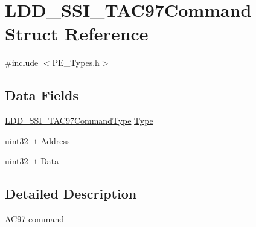 \hypertarget{struct_l_d_d___s_s_i___t_a_c97_command}{\section{L\-D\-D\-\_\-\-S\-S\-I\-\_\-\-T\-A\-C97\-Command Struct Reference}
\label{struct_l_d_d___s_s_i___t_a_c97_command}
}


{\ttfamily \#include $<$P\-E\-\_\-\-Types.\-h$>$}

\subsection*{Data Fields}
\begin{DoxyCompactItemize}
\item 
\hyperlink{group___p_e___types__module_gac7398329f7fdf5c8834b026e63f5edc2}{L\-D\-D\-\_\-\-S\-S\-I\-\_\-\-T\-A\-C97\-Command\-Type} \hyperlink{struct_l_d_d___s_s_i___t_a_c97_command_ac7226beaf57a764f71faf7e822e27a6e}{Type}
\item 
uint32\-\_\-t \hyperlink{struct_l_d_d___s_s_i___t_a_c97_command_a0d39df5cae85e73b036af81e9fbc6332}{Address}
\item 
uint32\-\_\-t \hyperlink{struct_l_d_d___s_s_i___t_a_c97_command_abc16535d09d61f2c3f885adf91632117}{Data}
\end{DoxyCompactItemize}


\subsection{Detailed Description}
A\-C97 command 

